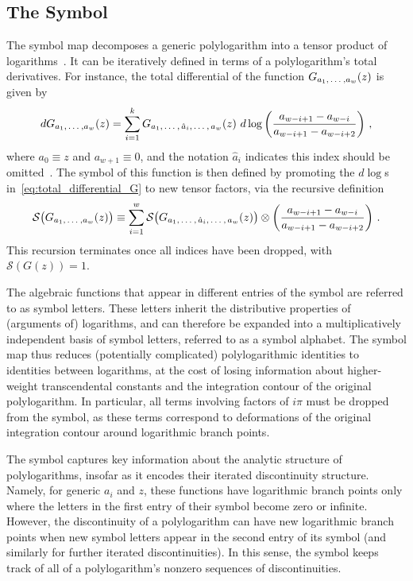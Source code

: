\documentclass[11pt]{article}
\newcommand{\fwboxL}[2]{\text{\makebox[#1][l]{$#2$}}}
\begin{document}
\subsection{The Symbol}

The symbol map decomposes a generic polylogarithm into a tensor product of logarithms~\cite{Goncharov:2010jf}. It can be iteratively defined in terms of a polylogarithm's total derivatives. For instance, the total differential of the function $G_{a_1, \fwboxL{13pt}{\,\dots}, a_w}(z)$ is given by
\begin{equation} \label{eq:total_differential_G}
d G_{a_1, \fwboxL{13pt}{\,\dots}, a_w}(z) = \sum_{i=1}^{k} G_{a_1,\fwboxL{13pt}{\,\dots},\,\hat{a}_i,\fwboxL{13pt}{\,\dots},\,a_w}(z) \ d\log \left( \frac{a_{w-i+1} - a_{w-i}}{a_{w-i+1} - a_{w-i+2}} \right)\, ,
\end{equation} 
where $a_0 \equiv z$ and $a_{w+1} \equiv 0$, and the notation $\hat{a}_i$ indicates this index should be omitted~\cite{GoncharovMixedTate,Duhr:2011zq}. The symbol of this function is then defined by promoting the $d\log$s in~\eqref{eq:total_differential_G} to new tensor factors, via the recursive definition  
\begin{equation} \label{eq:symbol_def}
\mathcal{S}\big(G_{a_1, \fwboxL{13pt}{\,\dots}, a_w}(z)\big) \equiv \sum_{i=1}^{w} \mathcal{S}\big(G_{a_1,\fwboxL{13pt}{\,\dots},\,\hat{a}_i,\fwboxL{13pt}{\,\dots},\,a_w}(z) \big) \otimes \left( \frac{a_{w-i+1} - a_{w-i}}{a_{w-i+1} - a_{w-i+2}} \right)\, .
\end{equation} 
This recursion terminates once all indices have been dropped, with $\mathcal{S}(G(z)) = 1$.

The algebraic functions that appear in different entries of the symbol are referred to as symbol letters. These letters inherit the distributive properties of (arguments of) logarithms, and can therefore be expanded into a multiplicatively independent basis of symbol letters, referred to as a symbol alphabet. The symbol map thus reduces (potentially complicated) polylogarithmic identities to identities between logarithms, at the cost of losing information about higher-weight transcendental constants and the integration contour of the original polylogarithm. In particular, all terms involving factors of $i\pi$ must be dropped from the symbol, as these terms correspond to deformations of the original integration contour around logarithmic branch points.
 
The symbol captures key information about the analytic structure of polylogarithms, insofar as it encodes their iterated discontinuity structure. Namely, for generic $a_i$ and $z$, these functions have logarithmic branch points only where the letters in the first entry of their symbol become zero or infinite. However, the discontinuity of a polylogarithm can have new logarithmic branch points when new symbol letters appear in the second entry of its symbol (and similarly for further iterated discontinuities). In this sense, the symbol keeps track of all of a polylogarithm's nonzero sequences of discontinuities. 
\end{document}
